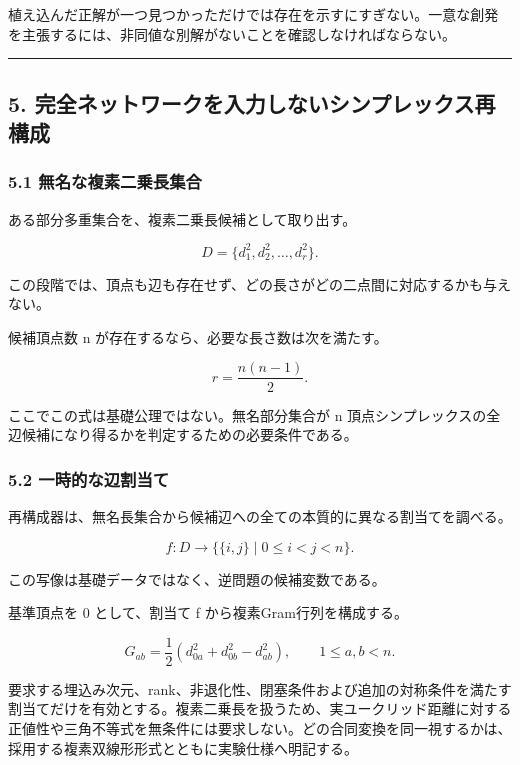 \documentclass[
  a4paper,
]{ltjsarticle}
\begin{document}
植え込んだ正解が一つ見つかっただけでは存在を示すにすぎない。一意な創発を主張するには、非同値な別解がないことを確認しなければならない。

\begin{center}\rule{0.5\linewidth}{0.5pt}\end{center}

\subsection{5.
完全ネットワークを入力しないシンプレックス再構成}\label{ux5b8cux5168ux30cdux30c3ux30c8ux30efux30fcux30afux3092ux5165ux529bux3057ux306aux3044ux30b7ux30f3ux30d7ux30ecux30c3ux30afux30b9ux518dux69cbux6210}

\subsubsection{5.1
無名な複素二乗長集合}\label{ux7121ux540dux306aux8907ux7d20ux4e8cux4e57ux9577ux96c6ux5408}

ある部分多重集合を、複素二乗長候補として取り出す。

\[
D
=
\{d_1^2,d_2^2,\ldots,d_r^2\}.
\]

この段階では、頂点も辺も存在せず、どの長さがどの二点間に対応するかも与えない。

候補頂点数 n が存在するなら、必要な長さ数は次を満たす。

\[
r
=
\frac{n(n-1)}{2}.
\]

ここでこの式は基礎公理ではない。無名部分集合が n
頂点シンプレックスの全辺候補になり得るかを判定するための必要条件である。

\subsubsection{5.2
一時的な辺割当て}\label{ux4e00ux6642ux7684ux306aux8fbaux5272ux5f53ux3066}

再構成器は、無名長集合から候補辺への全ての本質的に異なる割当てを調べる。

\[
f:
D
\longrightarrow
\bigl\{\{i,j\}\mid 0\leq i<j<n\bigr\}.
\]

この写像は基礎データではなく、逆問題の候補変数である。

基準頂点を 0 として、割当て f から複素Gram行列を構成する。

\[
G_{ab}
=
\frac{1}{2}
\left(
d_{0a}^2+d_{0b}^2-d_{ab}^2
\right),
\qquad
1\leq a,b<n.
\]

要求する埋込み次元、rank、非退化性、閉塞条件および追加の対称条件を満たす割当てだけを有効とする。複素二乗長を扱うため、実ユークリッド距離に対する正値性や三角不等式を無条件には要求しない。どの合同変換を同一視するかは、採用する複素双線形形式とともに実験仕様へ明記する。
\end{document}
